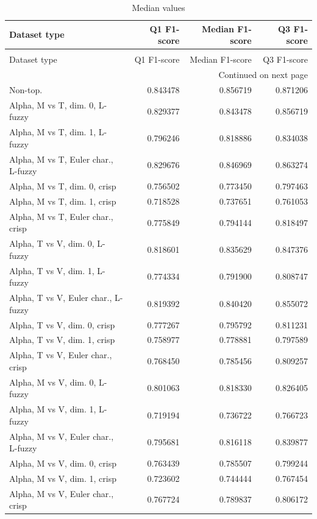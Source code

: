 \begin{longtable}{lrrr}
\caption{Median values} \label{tab:medians} \\
\toprule
Dataset type & Q1 F1-score & Median F1-score & Q3 F1-score \\
\midrule
\endfirsthead
\caption[]{Median values} \\
\toprule
Dataset type & Q1 F1-score & Median F1-score & Q3 F1-score \\
\midrule
\endhead
\midrule
\multicolumn{4}{r}{Continued on next page} \\
\midrule
\endfoot
\bottomrule
\endlastfoot
Non-top. & 0.843478 & 0.856719 & 0.871206 \\
Alpha, M vs T, dim. 0, L-fuzzy & 0.829377 & 0.843478 & 0.856719 \\
Alpha, M vs T, dim. 1, L-fuzzy & 0.796246 & 0.818886 & 0.834038 \\
Alpha, M vs T, Euler char., L-fuzzy & 0.829676 & 0.846969 & 0.863274 \\
Alpha, M vs T, dim. 0, crisp & 0.756502 & 0.773450 & 0.797463 \\
Alpha, M vs T, dim. 1, crisp & 0.718528 & 0.737651 & 0.761053 \\
Alpha, M vs T, Euler char., crisp & 0.775849 & 0.794144 & 0.818497 \\
Alpha, T vs V, dim. 0, L-fuzzy & 0.818601 & 0.835629 & 0.847376 \\
Alpha, T vs V, dim. 1, L-fuzzy & 0.774334 & 0.791900 & 0.808747 \\
Alpha, T vs V, Euler char., L-fuzzy & 0.819392 & 0.840420 & 0.855072 \\
Alpha, T vs V, dim. 0, crisp & 0.777267 & 0.795792 & 0.811231 \\
Alpha, T vs V, dim. 1, crisp & 0.758977 & 0.778881 & 0.797589 \\
Alpha, T vs V, Euler char., crisp & 0.768450 & 0.785456 & 0.809257 \\
Alpha, M vs V, dim. 0, L-fuzzy & 0.801063 & 0.818330 & 0.826405 \\
Alpha, M vs V, dim. 1, L-fuzzy & 0.719194 & 0.736722 & 0.766723 \\
Alpha, M vs V, Euler char., L-fuzzy & 0.795681 & 0.816118 & 0.839877 \\
Alpha, M vs V, dim. 0, crisp & 0.763439 & 0.785507 & 0.799244 \\
Alpha, M vs V, dim. 1, crisp & 0.723602 & 0.744444 & 0.767454 \\
Alpha, M vs V, Euler char., crisp & 0.767724 & 0.789837 & 0.806172 \\

\end{longtable}
